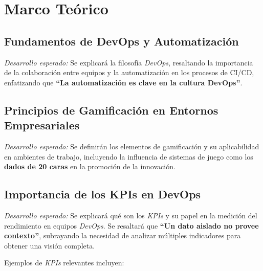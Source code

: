 \documentclass[journal]{IEEEtran}
\begin{document}
\section{\textbf{\Large Marco Teórico}}

\subsection{\textbf{Fundamentos de DevOps y Automatización}}

\textit{Desarrollo esperado:} Se explicará la filosofía \textit{DevOps}, resaltando la importancia de la colaboración entre equipos y la automatización en los procesos de CI/CD, enfatizando que \textbf{``La automatización es clave en la cultura DevOps''}.

\subsection{\textbf{Principios de Gamificación en Entornos Empresariales}}

\textit{Desarrollo esperado:} Se definirán los elementos de gamificación y su aplicabilidad en ambientes de trabajo, incluyendo la influencia de sistemas de juego como los \textbf{dados de 20 caras} en la promoción de la innovación.

\subsection{\textbf{Importancia de los KPIs en DevOps}}

\textit{Desarrollo esperado:} Se explicará qué son los \textit{KPIs} y su papel en la medición del rendimiento en equipos \textit{DevOps}. Se resaltará que \textbf{``Un dato aislado no provee contexto''}, subrayando la necesidad de analizar múltiples indicadores para obtener una visión completa.

Ejemplos de \textit{KPIs} relevantes incluyen:
\end{document}
